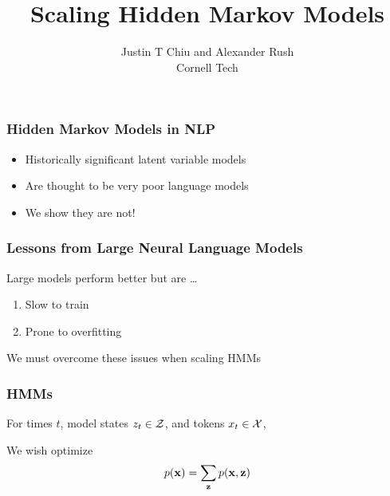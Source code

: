 \documentclass{beamer}
\title{Scaling Hidden Markov Models}
\author{Justin T Chiu and Alexander Rush\\Cornell Tech}
\begin{document}
\frame{\titlepage}

\begin{frame}
\frametitle{Hidden Markov Models in NLP}
\begin{itemize}
\item Historically significant latent variable models
\vspace{2em}
\item Are thought to be very poor language models
\vspace{2em}
\item We show they are not!
\end{itemize}
\end{frame}

\begin{frame}
\frametitle{Lessons from Large Neural Language Models}

Large models perform better but are \ldots
\vspace{1em}
\begin{enumerate}
\item Slow to train
\vspace{1em}
\item Prone to overfitting
\end{enumerate}
\vspace{1em}
We must overcome these issues when scaling HMMs
\end{frame}

\begin{frame}
\frametitle{HMMs}

For times $t$, model states $z_t \in \mathcal{Z}$, and tokens $x_t \in \mathcal{X}$,

\begin{center}
\end{center}

\vspace{1em}
We wish optimize
\begin{equation*}
p(\mathbf{x}) = \sum_{\mathbf{z}} p(\mathbf{x},\mathbf{z})
\end{equation*}
\end{frame}
\end{document}
